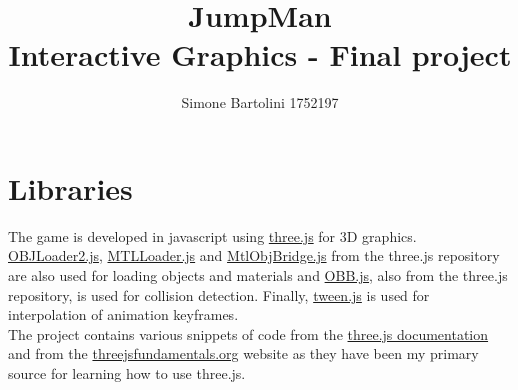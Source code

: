\documentclass[12pt]{article}
\title{JumpMan \\ \large Interactive Graphics - Final project}
\author{Simone Bartolini 1752197}
\date{}
\begin{document}
\maketitle
\thispagestyle{empty}






\section{Libraries}
The game is developed in javascript using \href{https://threejs.org}{three.js} for 3D graphics. \href{https://github.com/SapienzaInteractiveGraphicsCourse/final-project-jumpman/blob/master/source/three.js-r118/examples/jsm/loaders/OBJLoader2.js}{OBJLoader2.js}, \href{https://github.com/SapienzaInteractiveGraphicsCourse/final-project-jumpman/blob/master/source/three.js-r118/examples/jsm/loaders/MTLLoader.js}{MTLLoader.js} and \href{https://github.com/SapienzaInteractiveGraphicsCourse/final-project-jumpman/blob/master/source/three.js-r118/examples/jsm/loaders/obj2/bridge/MtlObjBridge.js}{MtlObjBridge.js} from the three.js repository are also used for loading objects and materials and \href{https://github.com/SapienzaInteractiveGraphicsCourse/final-project-jumpman/blob/master/source/three.js-r118/examples/jsm/math/OBB.js}{OBB.js}, also from the three.js repository, is used for collision detection. Finally, \href{https://github.com/tweenjs/tween.js}{tween.js} is used for interpolation of animation keyframes. \\
The project contains various snippets of code from the \href{https://threejs.org/docs/index.html#manual/en/introduction/Creating-a-scene}{three.js documentation} and from the \href{https://threejsfundamentals.org}{threejsfundamentals.org} website as they have been my primary source for learning how to use three.js.
\end{document}
